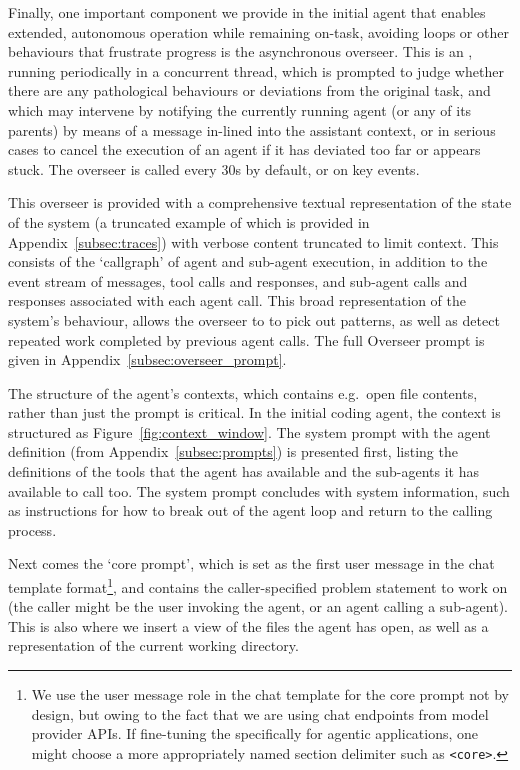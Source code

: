 
Finally, one important component we provide in the initial agent that enables
extended, autonomous operation while remaining on-task, avoiding loops or other
behaviours that frustrate progress is the asynchronous overseer. This is an
, running periodically in a concurrent thread, which is prompted to
judge whether there are any pathological behaviours or deviations from the
original task, and which may intervene by notifying the currently running agent
(or any of its parents) by means of a message in-lined into the assistant
context, or in serious cases to cancel the execution of an agent if it has
deviated too far or appears stuck. The overseer is called every 30s by default,
or on key events.

This overseer is provided with a comprehensive textual representation of the
state of the system (a truncated example of which is provided in
Appendix~\ref{subsec:traces}) with verbose content truncated to limit context.
This consists of the `callgraph' of agent and sub-agent execution, in addition
to the event stream of  messages, tool calls and responses, and
sub-agent calls and responses associated with each agent call.  This broad
representation of the system's behaviour, allows the overseer to to pick out
patterns, as well as detect repeated work completed by previous agent calls. The
full Overseer prompt is given in Appendix~\ref{subsec:overseer_prompt}.

The structure of the agent's contexts, which contains e.g.\ open file contents, rather than just the prompt is critical.  In the initial coding agent, the context is structured as Figure~\ref{fig:context_window}.
The system prompt with the agent definition (from Appendix~\ref{subsec:prompts}) is presented first, listing the
definitions of the tools that the agent has available and
the sub-agents it has available to call too. The system prompt concludes with system
information, such as instructions for how to break out of the agent loop and
return to the calling process.

Next comes the `core prompt', which is set as the first user message in the
chat template format\footnote{We use the user message role in the chat template
for the core prompt not by design, but owing to the fact that we are using chat
endpoints from model provider APIs. If fine-tuning the  specifically
for agentic applications, one might choose a more appropriately named section
delimiter such as \texttt{<core>}.}, and contains the caller-specified problem
statement to work on (the caller might be the user invoking the agent, or an
agent calling a sub-agent). This is also where we insert a view of the files the
agent has open, as well as a representation of the current working directory.

